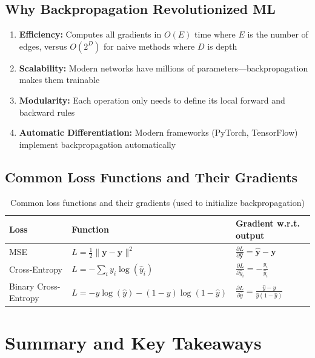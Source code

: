 \begin{notechapter}
\subsection{Why Backpropagation Revolutionized ML}

\begin{enumerate}
    \item \textbf{Efficiency:} Computes all gradients in $O(E)$ time where $E$ is the number of edges, versus $O(2^D)$ for naive methods where $D$ is depth
    
    \item \textbf{Scalability:} Modern networks have millions of parameters—backpropagation makes them trainable
    
    \item \textbf{Modularity:} Each operation only needs to define its local forward and backward rules
    
    \item \textbf{Automatic Differentiation:} Modern frameworks (PyTorch, TensorFlow) implement backpropagation automatically
\end{enumerate}

\subsection{Common Loss Functions and Their Gradients}

\begin{table}[h]
\centering
\begin{tabular}{|l|l|l|}
\hline
\textbf{Loss} & \textbf{Function} & \textbf{Gradient w.r.t. output} \\
\hline
MSE & $L = \frac{1}{2}\|\mathbf{y} - \hat{\mathbf{y}}\|^2$ & $\frac{\partial L}{\partial \hat{\mathbf{y}}} = \hat{\mathbf{y}} - \mathbf{y}$ \\
\hline
Cross-Entropy & $L = -\sum_i y_i \log(\hat{y}_i)$ & $\frac{\partial L}{\partial \hat{y}_i} = -\frac{y_i}{\hat{y}_i}$ \\
\hline
Binary Cross-Entropy & $L = -y\log(\hat{y}) - (1-y)\log(1-\hat{y})$ & $\frac{\partial L}{\partial \hat{y}} = \frac{\hat{y}-y}{\hat{y}(1-\hat{y})}$ \\
\hline
\end{tabular}
\caption{Common loss functions and their gradients (used to initialize backpropagation)}
\end{table}

\section{Summary and Key Takeaways}


\end{notechapter}
